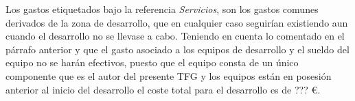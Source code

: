 Los gastos etiquetados bajo la referencia \textit{Servicios}, son los gastos comunes derivados de la zona de desarrollo, que en cualquier caso seguirían existiendo aun cuando el desarrollo no se llevase a cabo.
Teniendo en cuenta lo comentado en el párrafo anterior y que el gasto asociado a los equipos de desarrollo y el sueldo del equipo no se harán efectivos, puesto que el equipo consta de un único componente que es el autor del presente \ac{TFG} y los equipos están en posesión anterior al inicio del desarrollo el coste total para el desarrollo es de ??? \euro.

